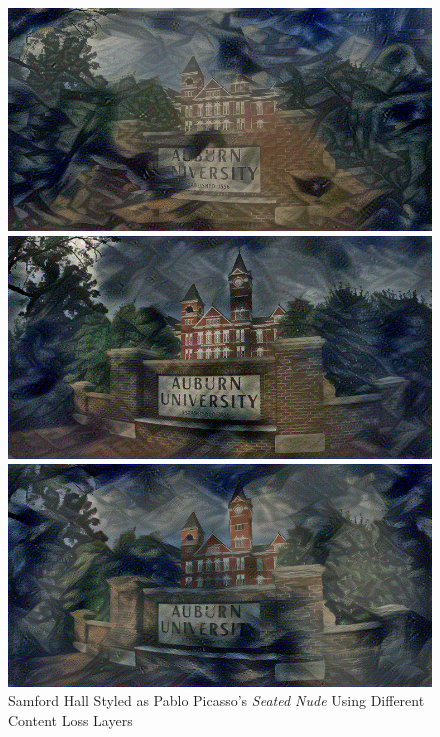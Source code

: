\documentclass{article}
\begin{document}
\begin{figure}
\centering
\caption{Samford Hall Styled as Pablo Picasso's \textit{Seated Nude} Using
Different Content Loss Layers}
\label{fig:content-layers-effect}

    \begin{minipage}{0.3\linewidth}
    \includegraphics[width=\textwidth]{img/content-layer-selection/block1_conv1}
    \end{minipage}
    \begin{minipage}{0.3\linewidth}
    \includegraphics[width=\textwidth]{img/content-layer-selection/block2_conv1}
    \end{minipage}
    \begin{minipage}{0.3\linewidth}
    \includegraphics[width=\textwidth]{img/content-layer-selection/block3_conv1}
    \end{minipage}


\end{figure}
\end{document}
